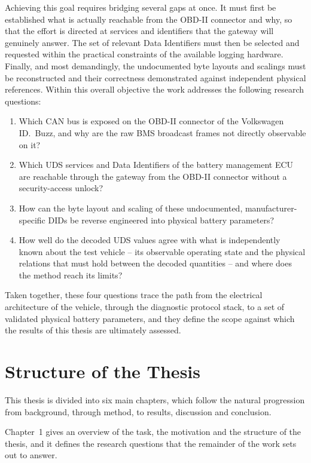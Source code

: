 \documentclass[11pt,a4paper,oneside,parskip=half]{scrreprt}
\begin{document}
Achieving this goal requires bridging several gaps at once. It must first be established what is actually reachable from the OBD-II connector and why, so that the effort is directed at services and identifiers that the gateway will genuinely answer. The set of relevant Data Identifiers must then be selected and requested within the practical constraints of the available logging hardware. Finally, and most demandingly, the undocumented byte layouts and scalings must be reconstructed and their correctness demonstrated against independent physical references. Within this overall objective the work addresses the following research questions:

\begin{enumerate}
  \item Which CAN bus is exposed on the OBD-II connector of the Volkswagen ID.~Buzz, and why are the raw BMS broadcast frames not directly observable on it?
  \item Which UDS services and Data Identifiers of the battery management ECU are reachable through the gateway from the OBD-II connector without a security-access unlock?
  \item How can the byte layout and scaling of these undocumented, manufacturer-specific DIDs be reverse engineered into physical battery parameters?
  \item How well do the decoded UDS values agree with what is independently known about the test vehicle -- its observable operating state and the physical relations that must hold between the decoded quantities -- and where does the method reach its limits?
\end{enumerate}

Taken together, these four questions trace the path from the electrical architecture of the vehicle, through the diagnostic protocol stack, to a set of validated physical battery parameters, and they define the scope against which the results of this thesis are ultimately assessed.

\section{Structure of the Thesis}
This thesis is divided into six main chapters, which follow the natural progression from background, through method, to results, discussion and conclusion.

Chapter~1 gives an overview of the task, the motivation and the structure of the thesis, and it defines the research questions that the remainder of the work sets out to answer.
\end{document}
